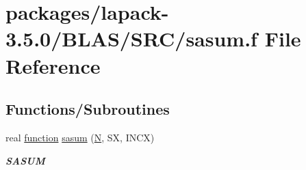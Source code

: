 \hypertarget{lapack-3_85_80_2BLAS_2SRC_2sasum_8f}{}\section{packages/lapack-\/3.5.0/\+B\+L\+A\+S/\+S\+R\+C/sasum.f File Reference}
\label{lapack-3_85_80_2BLAS_2SRC_2sasum_8f}
\subsection*{Functions/\+Subroutines}
\begin{DoxyCompactItemize}
\item 
real \hyperlink{afunc_8m_a7b5e596df91eadea6c537c0825e894a7}{function} \hyperlink{group__single__blas__level1_gafc5e1e8d9f26907c0a7cf878107f08cf}{sasum} (\hyperlink{polmisc_8c_a0240ac851181b84ac374872dc5434ee4}{N}, S\+X, I\+N\+C\+X)
\begin{DoxyCompactList}\small\item\em {\bfseries S\+A\+S\+U\+M} \end{DoxyCompactList}\end{DoxyCompactItemize}

